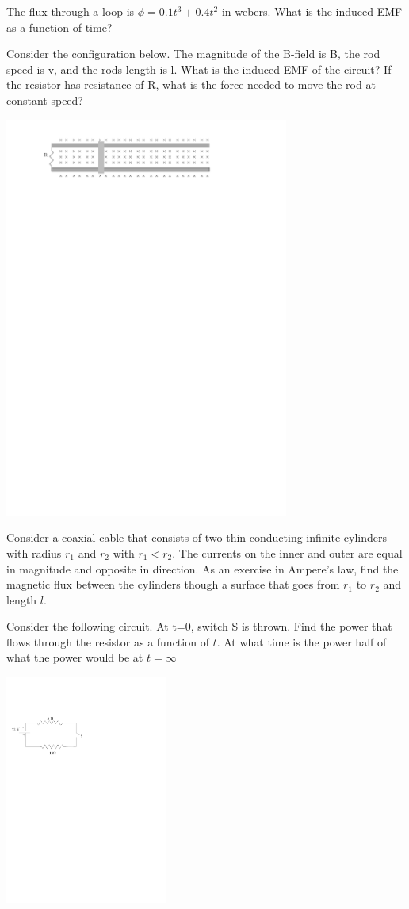 \documentclass[12pt]{article}
\begin{document}
\pagestyle{empty}

\noindent The flux through a loop is $\phi = 0.1 t^3 + 0.4 t^2$ in webers.  What is the induced EMF as a function of time? 
\newpage

\noindent Consider the configuration below.  The magnitude of the B-field is B, the rod speed is v, and the rods length is l.  What is the induced EMF of the circuit?  If the resistor has resistance of R, what is the force needed to move the rod at constant speed?

\includegraphics[width=0.7\textwidth]{magnetic_rod.pdf}
\newpage


\noindent Consider a coaxial cable that consists of two thin conducting infinite cylinders with radius $r_1$ and $r_2$ with $r_1 < r_2$.  The currents on the inner and outer are equal in magnitude and opposite in direction.  As an exercise in Ampere's law, find the magnetic flux between the cylinders though a surface that goes from $r_1$ to $r_2$ and length $l$. 

\newpage

\noindent Consider the following circuit.  At t=0, switch S is thrown.  Find the power that flows through the resistor as a function of $t$.  At what time is the power half of what the power would be at $t=\infty$ 

\includegraphics[width=0.4\textwidth]{inductor_circuit.pdf}
\end{document}
